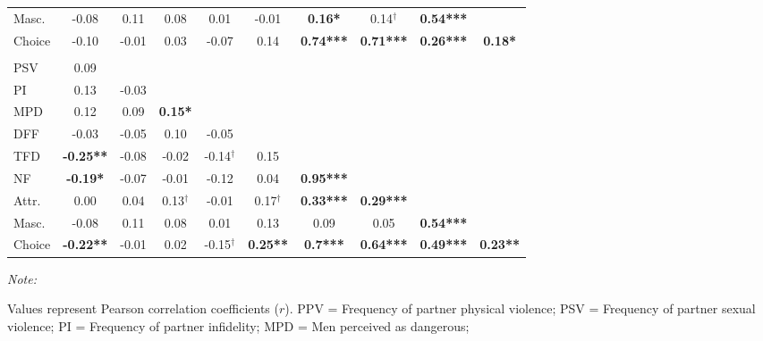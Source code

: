 \documentclass[
  bookmarksnumbered]{article}
\begin{document}
\begin{table}[H]
{\begin{threeparttable}
\begin{tabular}[t]{lccccccccc}
\hspace{1em}Masc. & -0.08 & 0.11 & 0.08 & 0.01 & -0.01 & \textbf{0.16*} & 0.14$^{\dagger}$ & \textbf{0.54***} & \\
\hspace{1em}Choice & -0.10 & -0.01 & 0.03 & -0.07 & 0.14 & \textbf{0.74***} & \textbf{0.71***} & \textbf{0.26***} & \textbf{0.18*}\\
\addlinespace[0.3em]
\hline
\multicolumn{10}{l}{\textbf{High condition, long-term relationship}}\\
\hline
\hspace{1em}PSV & 0.09 &  &  &  &  &  &  &  & \\
\hspace{1em}PI & 0.13 & -0.03 &  &  &  &  &  &  & \\
\hspace{1em}MPD & 0.12 & 0.09 & \textbf{0.15*} &  &  &  &  &  & \\
\hspace{1em}DFF & -0.03 & -0.05 & 0.10 & -0.05 &  &  &  &  & \\
\hspace{1em}TFD & \textbf{-0.25**} & -0.08 & -0.02 & -0.14$^{\dagger}$ & 0.15 &  &  &  & \\
\hspace{1em}NF & \textbf{-0.19*} & -0.07 & -0.01 & -0.12 & 0.04 & \textbf{0.95***} &  &  & \\
\hspace{1em}Attr. & 0.00 & 0.04 & 0.13$^{\dagger}$ & -0.01 & 0.17$^{\dagger}$ & \textbf{0.33***} & \textbf{0.29***} &  & \\
\hspace{1em}Masc. & -0.08 & 0.11 & 0.08 & 0.01 & 0.13 & 0.09 & 0.05 & \textbf{0.54***} & \\
\hspace{1em}Choice & \textbf{-0.22**} & -0.01 & 0.02 & -0.15$^{\dagger}$ & \textbf{0.25**} & \textbf{0.7***} & \textbf{0.64***} & \textbf{0.49***} & \textbf{0.23**}\\
\bottomrule
\end{tabular}
\begin{tablenotes}[para]
\item \textit{Note: } 
\item Values represent Pearson correlation coefficients ($r$). PPV = Frequency of partner physical violence; 
                            PSV = Frequency of partner sexual violence;
                            PI =  Frequency of partner infidelity; 
                            MPD = Men perceived as dangerous;

\end{tablenotes}
\end{threeparttable}}
\end{table}
\end{document}
